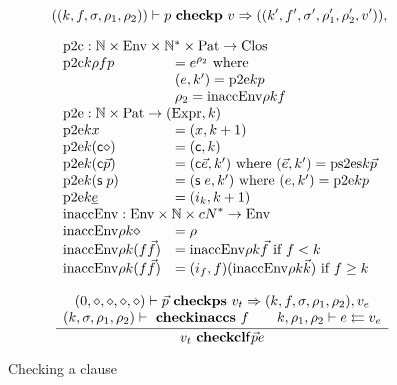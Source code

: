 \[
((k,f,\sigma,\rho_1,\rho_2))\vdash p\mbox{ \textbf{checkp} }v\Rightarrow ((k',f',\sigma',\rho'_1,\rho'_2,v')),\]

\[
\begin{array}{ll}
\multicolumn{2}{l}{\ptc : \cN \times \Env \times \ves{\cN} \times \Pat \ra \Clos}\\
\ptc k \rho f p & = \cl{e}{\rho_2} \mbox{ where } \\
& (e,k') = \pte k p \\
& \rho_2 = \inaccenv \rho k f \\
\multicolumn{2}{l}{\pte : \cN \times \Pat \ra (\Expr,k)}\\
\pte k x & = (x,k+1) \\
\pte k (\cc \diamond) & = (\cc,k) \\
\pte k (\cc \vec{p}) & = (\cc \vec{e},k') \mbox{ where } (\vec{e},k') = \pstes k \vec{p}\\
\pte k (\s p) & = (\s e,k') \mbox{ where } (e,k') = \pte k p\\
\pte k \inacc{e} & = (i_k,k+1) \\
\multicolumn{2}{l}{\inaccenv : \Env \times \cN \times \ves{cN} \ra \Env}\\
\inaccenv \rho k \diamond & = \rho \\
\inaccenv \rho k (f \vec{f}) & = \inaccenv \rho k \vec{f} \mbox{ if } f < k  \\
\inaccenv \rho k (f \vec{f}) & = \ins (i_f,f) (\inaccenv \rho k \vec{k}) \mbox { if } f \geq k 
\end{array}
\]

\begin{figure}
\begin{gather*}
\ \dfrac{\begin{array}[b]{c}(0,\diamond,\diamond,\diamond,\diamond)\vdash\vec{p}\mbox{ \textbf{checkps} }v_t\Rightarrow (k,f,\sigma,\rho_1,\rho_2),v_e\\(k,\sigma,\rho_1,\rho_2)\vdash\mbox{ \textbf{checkinaccs} }f 
\qquad
k,\rho_1,\rho_2\vdash e\leftleftarrows v_e
\end{array}}{
v_t\mbox{ \textbf{checkcl}}\mathsf{f} \vec{p} e
}
\end{gather*}
\caption{Checking a clause}
\end{figure}

